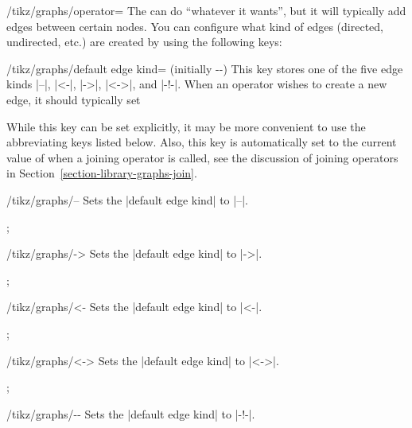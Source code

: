 \begin{key}{/tikz/graphs/operator=}
    The  can do ``whatever it wants'', but it will typically add
    edges between certain nodes. You can configure what kind of edges
    (directed, undirected, etc.) are created by using the following keys:
    \begin{key}{/tikz/graphs/default edge kind= (initially -\/-)}
        This key stores one of the five edge kinds |--|, |<-|, |->|, |<->|, and
        |-!-|. When an operator wishes to create a new edge, it should
        typically set
\begin{codeexample}
\end{codeexample}
        While this key can be set explicitly, it may be more convenient to use
        the abbreviating keys listed below. Also, this key is automatically set
        to the current value of  when a joining
        operator is called, see the discussion of joining operators in
        Section~\ref{section-library-graphs-join}.
    \end{key}
    \begin{key}{/tikz/graphs/--}
        Sets the |default edge kind| to |--|.
\begin{codeexample}[]
\tikz {};
\end{codeexample}
    \end{key}
    \begin{key}{/tikz/graphs/->}
        Sets the |default edge kind| to |->|.
\begin{codeexample}[]
\tikz {};
\end{codeexample}
    \end{key}
    \begin{key}{/tikz/graphs/<-}
        Sets the |default edge kind| to |<-|.
\begin{codeexample}[]
\tikz {};
\end{codeexample}
    \end{key}
    \begin{key}{/tikz/graphs/<->}
        Sets the |default edge kind| to |<->|.
\begin{codeexample}[]
\tikz {};
\end{codeexample}
    \end{key}
    \begin{key}{/tikz/graphs/-\protect\exclamationmarktext-}
        Sets the |default edge kind| to |-!-|.
    \end{key}


\end{key}
